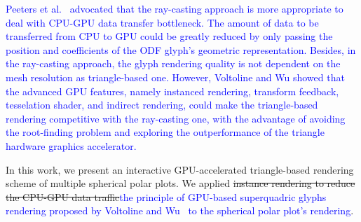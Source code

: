 \documentclass[twoside,twocolumn,10pt]{article}
\begin{document}
\textcolor{blue}{Peeters et al.~\cite{peeters2009} advocated that the ray-casting approach is more appropriate to deal with CPU-GPU data transfer bottleneck. The amount of data to be transferred from CPU to GPU could be greatly reduced by only passing the position and coefficients of the ODF glyph's geometric representation. Besides, in the ray-casting approach, the glyph rendering quality is not dependent on the mesh resolution as triangle-based one. However, Voltoline and Wu showed that the advanced GPU features, \todo{\textcolor{magenta}{We could be more specific on }}namely instanced rendering, transform feedback, tesselation shader, and indirect rendering, could make the triangle-based rendering competitive with the ray-casting one, with the advantage of avoiding the root-finding problem and exploring the outperformance of the triangle hardware graphics accelerator.}



In this work, we present an interactive GPU-accelerated triangle-based rendering scheme of multiple spherical polar plots. We applied \sout{instance rendering to reduce the CPU-GPU data traffic}\textcolor{blue}{the principle of GPU-based superquadric glyphs rendering proposed by Voltoline and Wu~\cite{voltoline2021} to the spherical polar plot's rendering}.


\end{document}
